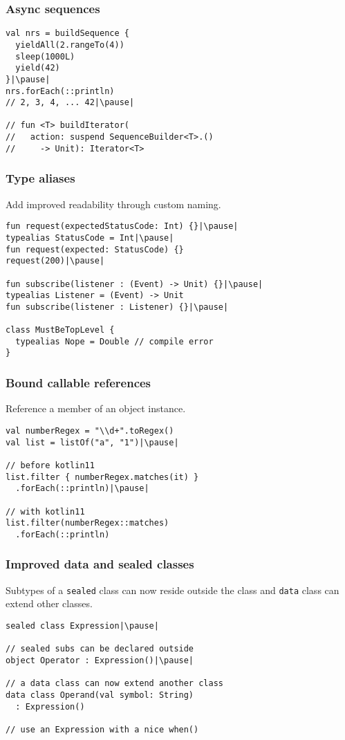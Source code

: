 \begin{frame}[fragile] \frametitle{Async sequences}
\begin{lstlisting}
val nrs = buildSequence {
  yieldAll(2.rangeTo(4))
  sleep(1000L)
  yield(42)
}|\pause|
nrs.forEach(::println)
// 2, 3, 4, ... 42|\pause|

// fun <T> buildIterator(
//   action: suspend SequenceBuilder<T>.() 
//     -> Unit): Iterator<T>
\end{lstlisting}
\end{frame}



\begin{frame}[fragile] \frametitle{Type aliases}
Add improved readability through custom naming.\pause
\begin{lstlisting}
fun request(expectedStatusCode: Int) {}|\pause|
typealias StatusCode = Int|\pause|
fun request(expected: StatusCode) {}
request(200)|\pause|

fun subscribe(listener : (Event) -> Unit) {}|\pause|
typealias Listener = (Event) -> Unit
fun subscribe(listener : Listener) {}|\pause|

class MustBeTopLevel {
  typealias Nope = Double // compile error
}
\end{lstlisting}
\end{frame}


\begin{frame}[fragile] \frametitle{Bound callable references}
Reference a member of an object instance.
\begin{lstlisting}
val numberRegex = "\\d+".toRegex()
val list = listOf("a", "1")|\pause|

// before kotlin11
list.filter { numberRegex.matches(it) }
  .forEach(::println)|\pause|

// with kotlin11
list.filter(numberRegex::matches)
  .forEach(::println)
\end{lstlisting}
\end{frame}


\begin{frame}[fragile] \frametitle{Improved data and sealed classes}
Subtypes of a \texttt{sealed} class can now reside outside the class and \texttt{data} class can extend other classes.
\begin{lstlisting}
sealed class Expression|\pause|

// sealed subs can be declared outside
object Operator : Expression()|\pause|

// a data class can now extend another class
data class Operand(val symbol: String)
  : Expression()
  
// use an Expression with a nice when()
\end{lstlisting}
\end{frame}


